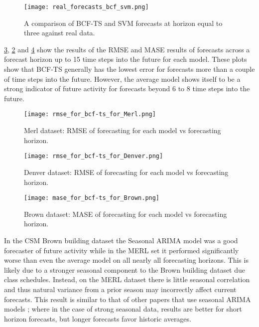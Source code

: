 \begin{figure}[h]
\centering
\texttt{[image: real\_forecasts\_bcf\_svm.png]}
\caption{A comparison of BCF-TS and SVM forecasts at horizon equal to three against real data.}
\label{fig:realbcfsvm}
\end{figure}

\ref{fig:rmseplotdenver}, \ref{fig:rmseplotmerl} and \ref{fig:maseplotbrown} show the results of the RMSE and MASE results of forecasts across a forecast horizon up to 15 time steps into the future for each model.  These plots show that BCF-TS generally has the lowest error for forecasts more than a couple of time steps into the future.  However, the average model shows itself to be a strong indicator of future activity for forecasts beyond 6 to 8 time steps into the future.

\begin{figure}[!ht]
	\begin{center}
		\texttt{[image: rmse\_for\_bcf-ts\_for\_Merl.png]}
	\end{center}
	\caption{Merl dataset: RMSE of forecasting for each model vs forecasting horizon.}
	\label{fig:rmseplotmerl}
\end{figure}

\begin{figure}[h]
	\begin{center}
		\texttt{[image: rmse\_for\_bcf-ts\_for\_Denver.png]}
	\end{center}
	\caption{Denver dataset: RMSE of forecasting for each model vs forecasting horizon.}
	\label{fig:rmseplotdenver}
\end{figure}

\begin{figure}[h]
	\begin{center}
		\texttt{[image: mase\_for\_bcf-ts\_for\_Brown.png]}
	\end{center}
	\caption{Brown dataset: MASE of forecasting for each model vs forecasting horizon.}
	\label{fig:maseplotbrown}
\end{figure}

In the CSM Brown building dataset the Seasonal ARIMA model was a good forecaster of future activity while in the MERL set it performed significantly worse than even the average model on all nearly all forecasting horizons.  This is likely due to a stronger seasonal component to the Brown building dataset due class schedules.  Instead, on the MERL dataset there is little seasonal correlation and thus natural variance from a prior season may incorrectly affect current forecasts.  This result is similar to that of other papers that use seasonal ARIMA models \cite{Newsham2010}; where in the case of strong seasonal data, results are better for short horizon forecasts, but longer forecasts favor historic averages.


